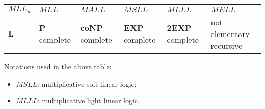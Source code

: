 \begin{center}
\begin{tabular}{llllll}
\hline
\(MLL_u\) & \(MLL\) & \(MALL\) & \(MSLL\) & \(MLLL\) &
\(MELL\)\\
\(\mathbf L\) & \(\mathbf{P}\)-complete & \(\mathbf{coNP}\)-complete &
\(\mathbf{EXP}\)-complete & \(\mathbf{2EXP}\)-complete & not elementary
recursive\\
\hline
\end{tabular}
\end{center}

Notations used in the above table:
\begin{itemize}
\item \(MSLL\): multiplicative soft linear logic;
\item \(MLLL\): multiplicative light linear logic.
\end{itemize}



